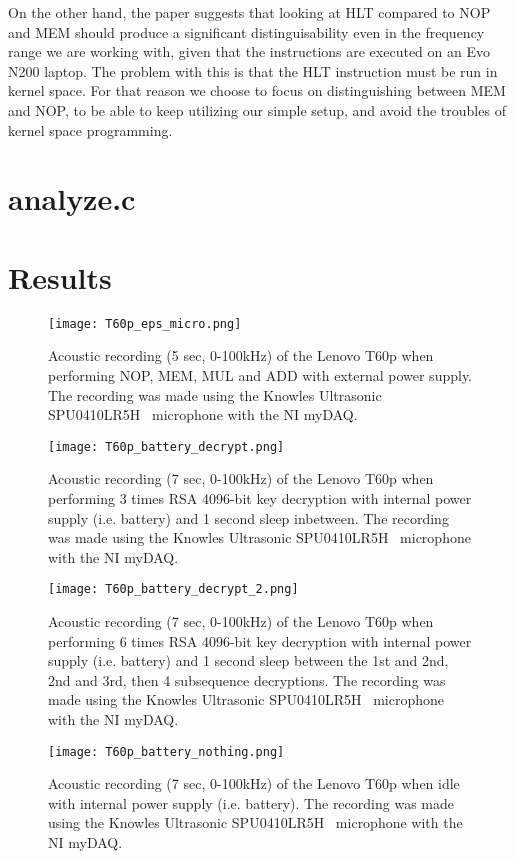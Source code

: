 On the other hand, the paper suggests that looking at HLT compared to NOP and MEM should produce a significant distinguisability even in the frequency range we are working with, given that the instructions are executed on an Evo N200 laptop.
The problem with this is that the HLT instruction must be run in kernel space.
For that reason we choose to focus on distinguishing between MEM and NOP, to be able to keep utilizing our simple setup, and avoid the troubles of kernel space programming.

\section{analyze.c}\label{sec:ch4_analyse}


\section{Results}\label{sec:ch4_results}


\begin{figure}[h]
    \centering
    \texttt{[image: T60p\_eps\_micro.png]}
    \caption{Acoustic recording (5 sec, 0-100kHz) of the Lenovo T60p when performing NOP, MEM, MUL and ADD with external power supply. The recording was made using the Knowles Ultrasonic SPU0410LR5H~\cite{knowles_spec} microphone with the NI myDAQ. }
    \label{fig:T60p_eps_micr}
\end{figure}

\begin{figure}[h]
    \centering
    \texttt{[image: T60p\_battery\_decrypt.png]}
    \caption{Acoustic recording (7 sec, 0-100kHz) of the Lenovo T60p when performing 3 times RSA 4096-bit key decryption with internal power supply (i.e. battery) and 1 second sleep inbetween. The recording was made using the Knowles Ultrasonic SPU0410LR5H~\cite{knowles_spec} microphone with the NI myDAQ. }
    \label{fig:T60p_battery_decrypt}
\end{figure}

\begin{figure}[h]
    \centering
    \texttt{[image: T60p\_battery\_decrypt\_2.png]}
    \caption{Acoustic recording (7 sec, 0-100kHz) of the Lenovo T60p when performing 6 times RSA 4096-bit key decryption with internal power supply (i.e. battery) and 1 second sleep between the 1st and 2nd, 2nd and 3rd, then 4 subsequence decryptions. The recording was made using the Knowles Ultrasonic SPU0410LR5H~\cite{knowles_spec} microphone with the NI myDAQ. }
    \label{fig:T60p_battery_decrypt_2}
\end{figure}

\begin{figure}[h]
    \centering
    \texttt{[image: T60p\_battery\_nothing.png]}
    \caption{Acoustic recording (7 sec, 0-100kHz) of the Lenovo T60p when idle with internal power supply (i.e. battery). The recording was made using the Knowles Ultrasonic SPU0410LR5H~\cite{knowles_spec} microphone with the NI myDAQ. }
    \label{fig:T60p_battery_nothing}
\end{figure}